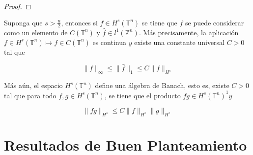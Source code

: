 \documentclass[12pt]{article}
\begin{document}
\begin{proof}
\end{proof}

\begin{theorem}\label{algebra}
Suponga que $s>\frac{n}{2}$, entonces si $f \in H^s\left(\mathbb{T}^n\right)$ se tiene que $f$ se puede considerar como un elemento de $C\left(\mathbb{T}^n\right)$ y $\widehat{f} \in l^1\left(\mathbb{Z}^n\right)$. Más precisamente, la aplicación $f \in H^s\left(\mathbb{T}^n\right) \mapsto f \in C\left(\mathbb{T}^n\right)$ es continua $y$ existe una constante universal $C>0$ tal que

$$
\|f\|_{\infty} \leq\|\widehat{f}\|_1 \leq C\|f\|_{H^s}
$$


Más aún, el espacio $H^s\left(\mathbb{T}^n\right)$ define una álgebra de Banach, esto es, existe $C>0$ tal que para todo $f, g \in H^s\left(\mathbb{T}^n\right)$, se tiene que el producto $f g \in H^s\left(\mathbb{T}^n\right)^1 y$

$$
\|f g\|_{H^s} \leq C\|f\|_{H^s}\|g\|_{H^s}
$$
\end{theorem}

\section{Resultados de Buen Planteamiento}

\newpage



\nocite{*}
\end{document}
